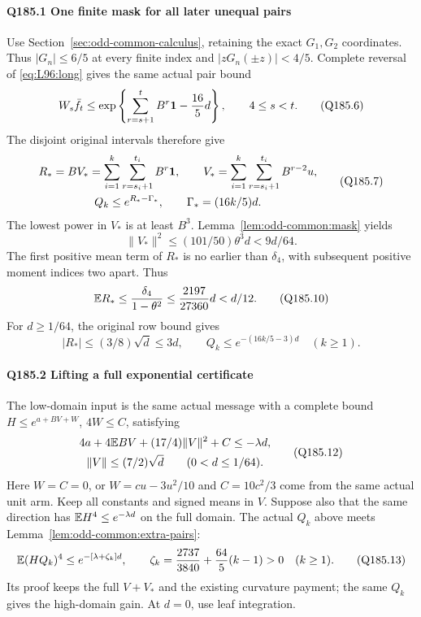 \paragraph{Q185.1 One finite mask for all later unequal pairs}

Use Section~\ref{sec:odd-common-calculus}, retaining the exact
\(G_1,G_2\) coordinates. Thus \(|G_n|\le6/5\) at every finite
index and \(|zG_n(\pm z)|<4/5\).
Complete reversal of \eqref{eq:L96:long}
gives the same actual pair bound
\[
 W_s\bar f_t\le
 \exp\left\{\sum_{r=s+1}^tB^r\mathbf1-\frac{16}{5}d\right\},
 \qquad4\le s<t.\tag{Q185.6}
\]
The disjoint original intervals therefore give
\[
 \begin{gathered}
 R_* =BV_*=\sum_{i=1}^k\sum_{r=s_i+1}^{t_i}B^r\mathbf1,\qquad
 V_*=\sum_{i=1}^k\sum_{r=s_i+1}^{t_i}B^{r-2}u,\\
 Q_k\le e^{R_*-\Gamma_*},\qquad\Gamma_*=(16k/5)d.
 \end{gathered}\tag{Q185.7}
\]
The lowest power in \(V_*\) is at least \(B^3\).
Lemma~\ref{lem:odd-common:mask} yields
\[
 \|V_*\|^2\le(101/50)\theta^3d<9d/64.\tag{Q185.9}
\]
The first positive mean term of \(R_*\) is no earlier than
\(\delta_4\), with subsequent positive moment indices two apart. Thus
\[
 \mathbb E R_*\le\frac{\delta_4}{1-\theta^2}
        \le\frac{2197}{27360}d<d/12.\tag{Q185.10}
\]
For \(d\ge1/64\), the original row bound gives
\[
 |R_*|\le(3/8)\sqrt d\le3d,\qquad
 Q_k\le e^{-(16k/5-3)d}\quad(k\ge1).\tag{Q185.11}
\]

\paragraph{Q185.2 Lifting a full exponential certificate}

The low-domain input is the same actual message with a complete bound
\(H\le e^{a+BV+W}\), \(4W\le C\), satisfying
\[
 \begin{gathered}
 4a+4\mathbb E BV+(17/4)\|V\|^2+C\le-\lambda d,\\
 \|V\|\le(7/2)\sqrt d\qquad(0<d\le1/64).
 \end{gathered}\tag{Q185.12}
\]
Here \(W=C=0\), or \(W=cu-3u^2/10\) and \(C=10c^2/3\)
come from the same actual unit arm. Keep all constants and signed means
in \(V\). Suppose also that the same direction has
\(\mathbb E H^4\le e^{-\lambda d}\) on the full domain.
The actual \(Q_k\) above meets Lemma~\ref{lem:odd-common:extra-pairs}:
\[
 \mathbb E(HQ_k)^4\le e^{-[\lambda+\zeta_k]d},\qquad
 \zeta_k=\frac{2737}{3840}+\frac{64}{5}(k-1)>0
 \quad(k\ge1).\tag{Q185.13}
\]
Its proof keeps the full \(V+V_*\) and the existing curvature
payment; the same \(Q_k\) gives the high-domain gain.
At \(d=0\), use leaf integration.

